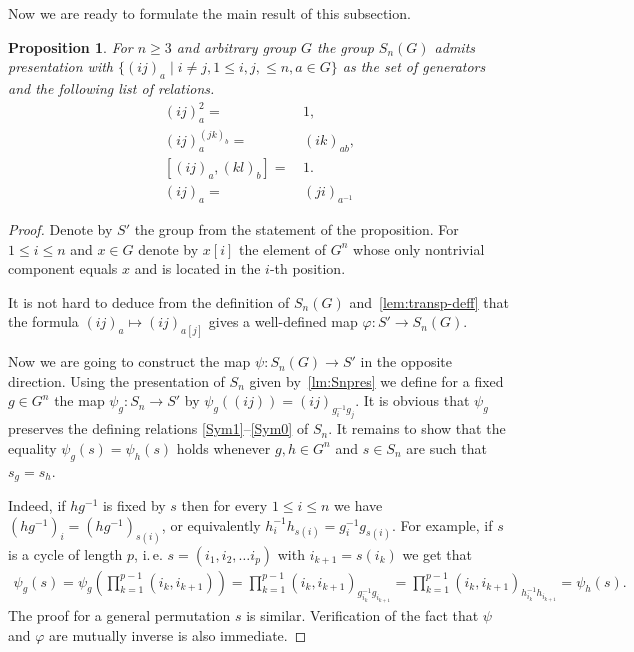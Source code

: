 \documentclass[oneside, 10pt]{amsart}
\theoremstyle{plain}
\numberwithin{equation}{section}
\numberwithin{lemma}{section}
\newtheorem{prop}[lemma]{Proposition}
\theoremstyle{remark}
\theoremstyle{definition}
\begin{document}
Now we are ready to formulate the main result of this subsection.
\begin{prop} \label{prop:Q-pres} For $n\geq 3$ and arbitrary group $G$ the group $S_n(G)$ admits presentation with 
$\{(ij)_a \mid i\neq j, 1\leq i,j,\leq n, a\in G\}$ 
as the set of generators and the following list of relations.
\begin{align}
(ij)_a^2 = &\, 1,                \label{Q1} \tag{SG1} \\
(ij)_a^{(jk)_b} = &\, (ik)_{ab}, \label{Q2} \tag{SG2} \\
[(ij)_a, (kl)_b] = &\,1.         \label{Q3} \tag{SG3} \\
(ij)_a =&\, (ji)_{a^{-1}}        \label{Q4} \tag{SG4} 
\end{align}
\end{prop}
\begin{proof}
Denote by $S'$ the group from the statement of the proposition.
For $1\leq i\leq n$ and $x\in G$ denote by $x[i]$ the element of $G^n$ 
 whose only nontrivial component equals $x$ and is located in the $i$-th position.

It is not hard to deduce from the definition of $S_n(G)$ and~\cref{lem:transp-deff} 
 that the formula $(ij)_a \mapsto (ij)_{a[j]}$ gives a well-defined map $\varphi\colon S'\to S_n(G)$.

Now we are going to construct the map $\psi\colon S_n(G)\to S'$ in the opposite direction. 
Using the presentation of $S_n$ given by~\cref{lm:Snpres}  we define for a fixed $g\in G^n$ the map 
 $\psi_g\colon S_n \to S'$ by $\psi_g((ij)) = (ij)_{g_i^{-1} g_j}.$
It is obvious that $\psi_g$ preserves the defining relations \eqref{Sym1}--\eqref{Sym0} of $S_n$. 
It remains to show that the equality $\psi_g(s) = \psi_h(s)$ holds whenever $g, h\in G^n$ and $s\in S_n$ are such that $s_g=s_h$.

Indeed, if $hg^{-1}$ is fixed by $s$ then for every $1\leq i\leq n$ we have $(hg^{-1})_i = (hg^{-1})_{s(i)}$, or equivalently
$h_i^{-1} h_{s(i)} = g_i^{-1} g_{s(i)}$. %
For example, if $s$ is a cycle of length $p$, i.\,e. $s=(i_1, i_2, \ldots i_p)$ with $i_{k+1} = s(i_k)$ we get that
\begin{multline} \nonumber
 \psi_g(s) = \psi_g\left({\prod\limits_{k=1}^{p-1}(i_k, i_{k+1})}\right) = 
 \prod\limits_{k=1}^{p-1}\left(i_k, i_{k+1}\right)_{g_{i_k}^{-1} g_{i_{k+1}}} = 
 \prod\limits_{k=1}^{p-1}\left(i_k, i_{k+1}\right)_{h_{i_k}^{-1} h_{i_{k+1}}} = \psi_h(s).
\end{multline}
The proof for a general permutation $s$ is similar.
Verification of the fact that $\psi$ and $\varphi$ are mutually inverse is also immediate.
\end{proof}
\end{document}
